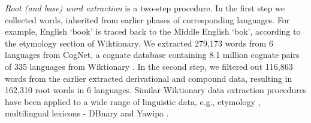 \documentclass[11pt]{article}
\begin{document}
\emph{Root (and base) word extraction} is a two-step procedure. In the first step we collected words, inherited from earlier phases of corresponding languages. For example, English `book' is traced back to the Middle English `bok', according to the etymology section of Wiktionary. We extracted 279,173 words from 6 languages from CogNet, a cognate database containing 8.1 million cognate pairs of 335 languages from Wiktionary  \cite{batsuren2019cognet,batsuren2021large}. In the second step, we filtered out 116,863 words from the earlier extracted derivational and compound data, resulting in 162,310 root words in 6 languages. Similar Wiktionary data extraction procedures have been applied to a wide range of linguistic data, e.g., etymology  \cite{fourrier2020methodological}, multilingual lexicons - DBnary \cite{serasset2015dbnary} and Yawipa \citep{wu-yarowsky-2020-computational}.  
\end{document}
